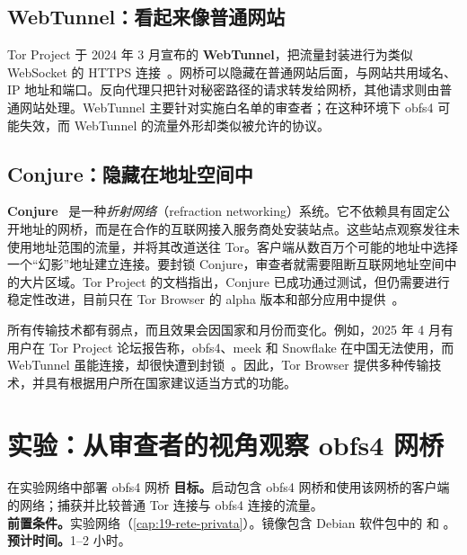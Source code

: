 \subsection{WebTunnel：看起来像普通网站}

Tor Project 于 2024 年 3 月宣布的 \textbf{WebTunnel}，把流量封装进行为类似 WebSocket 的 HTTPS 连接~\cite{torblogwebtunnel}。网桥可以隐藏在普通网站后面，与网站共用域名、IP 地址和端口。反向代理只把针对秘密路径的请求转发给网桥，其他请求则由普通网站处理。WebTunnel 主要针对实施白名单的审查者；在这种环境下 obfs4 可能失效，而 WebTunnel 的流量外形却类似被允许的协议。

\subsection{Conjure：隐藏在地址空间中}

\textbf{Conjure}~\cite{frolov2019conjure} 是一种\emph{折射网络}（refraction networking）系统。它不依赖具有固定公开地址的网桥，而是在合作的互联网接入服务商处安装站点。这些站点观察发往未使用地址范围的流量，并将其改道送往 Tor。客户端从数百万个可能的地址中选择一个\enquote{幻影}地址建立连接。要封锁 Conjure，审查者就需要阻断互联网地址空间中的大片区域。Tor Project 的文档指出，Conjure 已成功通过测试，但仍需要进行稳定性改进，目前只在 Tor Browser 的 alpha 版本和部分应用中提供~\cite{torsupport}。

\begin{attenzione}[没有一种传输技术在任何地方都有效]
所有传输技术都有弱点，而且效果会因国家和月份而变化。例如，2025 年 4 月有用户在 Tor Project 论坛报告称，obfs4、meek 和 Snowflake 在中国无法使用，而 WebTunnel 虽能连接，却很快遭到封锁~\cite{forumcina2025}。因此，Tor Browser 提供多种传输技术，并具有根据用户所在国家建议适当方式的功能。
\end{attenzione}

\section{实验：从审查者的视角观察 obfs4 网桥}\label{sec:lab-censura}

\begin{laboratorio}[10]{在实验网络中部署 obfs4 网桥}
\textbf{目标。}启动包含 obfs4 网桥和使用该网桥的客户端的网络；捕获并比较普通 Tor 连接与 obfs4 连接的流量。\\
\textbf{前置条件。}实验网络（\cref{cap:19-rete-privata}）。镜像包含 Debian 软件包中的  和 。\\
\textbf{预计时间。}1--2 小时。
\end{laboratorio}

